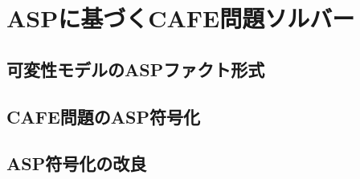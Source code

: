 \section{ASPに基づくCAFE問題ソルバー}


\subsection{可変性モデルのASPファクト形式}
\subsection{CAFE問題のASP符号化}
\subsection{ASP符号化の改良}